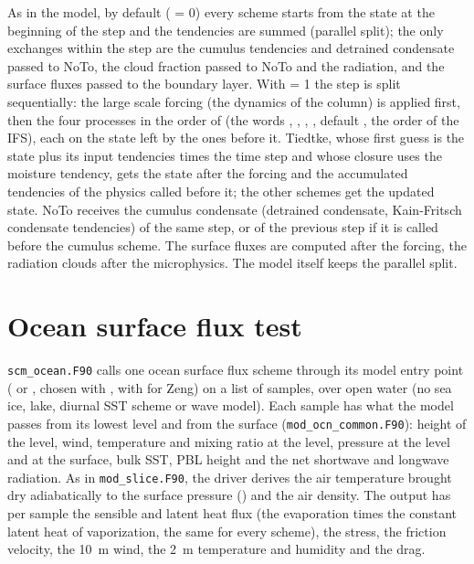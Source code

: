 As in the model, by default ( = 0) every scheme starts from the
state at the beginning of the step and the tendencies are summed (parallel
split); the only exchanges within the step are the cumulus tendencies and
detrained condensate passed to NoTo, the cloud fraction passed to NoTo and
the radiation, and the surface fluxes passed to the boundary layer. With
 = 1 the step is split sequentially: the large scale forcing
(the dynamics of the column) is applied first, then the four processes in
the order of  (the words , , ,
, default , the order of the IFS), each on
the state left by the ones before it. Tiedtke, whose first guess is the
state plus its input tendencies times the time step and whose closure uses
the moisture tendency, gets the state after the forcing and the
accumulated tendencies of the physics called before it; the other schemes
get the updated state. NoTo receives the cumulus condensate (detrained
condensate, Kain-Fritsch condensate tendencies) of the same step, or of the
previous step if it is called before the cumulus scheme. The surface
fluxes are computed after the forcing, the radiation clouds after the
microphysics. The model itself keeps the parallel split.

\section{Ocean surface flux test}

\verb=scm_ocean.F90= calls one ocean surface flux scheme through its
model entry point ( or , chosen with
, with  for Zeng) on a list of samples,
over open water (no sea
ice, lake, diurnal SST scheme or wave model). Each sample has what the
model passes from its lowest level and from the surface
(\verb=mod_ocn_common.F90=): height of the level, wind, temperature and
mixing ratio at the level, pressure at the level and at the surface, bulk
SST, PBL height and the net shortwave and longwave radiation. As in
\verb=mod_slice.F90=, the driver derives the air temperature brought dry
adiabatically to the surface pressure () and the air density.
The output has per sample the sensible and latent heat flux (the
evaporation times the constant latent heat of vaporization, the same for
every scheme), the stress, the friction velocity, the 10~m wind, the 2~m
temperature and humidity and the drag.

